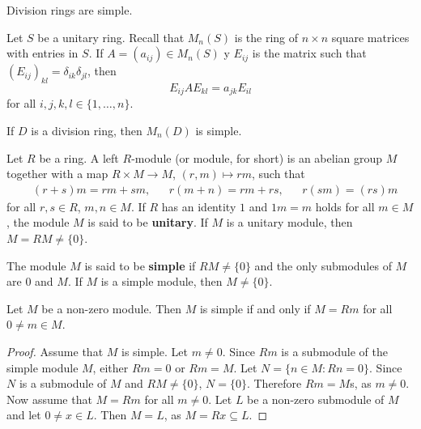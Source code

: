 \begin{example}
	Division rings are simple.
\end{example}

Let $S$ be a unitary ring. Recall that $M_n(S)$ is the ring of $n\times n$ square matrices 
with entries in $S$.  If $A=(a_{ij})\in M_n(S)$ y $E_{ij}$ is the matrix
such that $(E_{ij})_{kl}=\delta_{ik}\delta_{jl}$, then
\begin{equation}
	\label{eq:trick}
E_{ij}AE_{kl}=a_{jk}E_{il}
\end{equation}
for all $i,j,k,l\in\{1,\dots,n\}$. 

\begin{exercise}
	If $D$ is a division ring, then $M_n(D)$ is simple. 
\end{exercise}

Let $R$ be a ring. A left $R$-module (or module, for short)  
is an abelian group $M$ together with a map $R\times M\to M$, $(r,m)\mapsto rm$, such that
\begin{align*}
&(r+s)m=rm+sm, &&
r(m+n)=rm+rs, && r(sm)=(rs)m    
\end{align*}
for all $r,s\in R$, $m,n\in M$.  If $R$ has an identity 
$1$ and $1m=m$ holds for all $m\in M$, the module $M$ is said to be 
\textbf{unitary}.  If $M$ is a unitary module, then $M=RM\ne\{0\}$.


The module $M$ is said to be 
\textbf{simple} if $RM\ne\{0\}$ and the only submodules of $M$ are $0$ and $M$.
If $M$ is a simple module, then $M\ne\{0\}$.


\begin{lemma}
	\label{lemma:simple}
	Let $M$ be a non-zero module. Then $M$ is simple if and only if $M=Rm$
	for all $0\ne m\in M$.
\end{lemma}

\begin{proof}
	Assume that $M$ is simple.  Let $m\ne 0$. Since $Rm$ is a submodule of the simple 
	module $M$, either $Rm=0$ or $Rm=M$.  Let $N=\{n\in M:Rn=0\}$. Since $N$ is a 
	submodule of $M$ and $RM\ne\{0\}$, $N=\{0\}$. Therefore $Rm=M$s, as $m\ne0$.
	Now assume that $M=Rm$ for all $m\ne0$. Let $L$ be a non-zero submodule of 
	$M$ and let $0\ne x\in L$. Then $M=L$, as $M=Rx\subseteq L$. 
\end{proof} 

